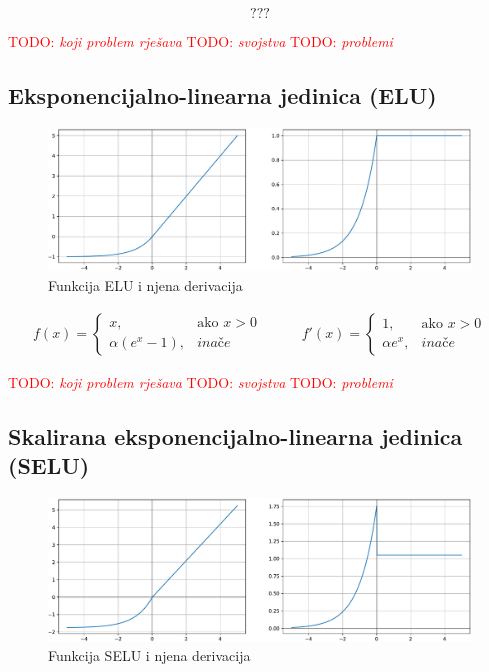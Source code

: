 \documentclass[times, utf8, diplomski]{fer}
\def\otherwise{\textit{inače}}
\def\TODO#1{\noindent\textcolor{red}{TODO: \textit{#1}}\newline}
\def\todo#1{\TODO{#1}}
\def\todoimg#1{\begin{center} \textcolor{red}{\big[ IMAGE: \textit{#1} \big]} \end{center}}
\begin{document}
\todoimg{}

\begin{equation}
???
\end{equation}

\todo{koji problem rješava}
\todo{svojstva}
\todo{problemi}

\subsection{Eksponencijalno-linearna jedinica (ELU)}

\begin{figure}[H]
\includegraphics[width=\textwidth]{ELU.pdf}
\centering
\caption{Funkcija ELU i njena derivacija}
\label{fig:elu}
\end{figure}

\begin{equation}
\label{eq:elu}
\begin{split}
f(x) = 
\begin{cases}
x,					& \text{ako } x > 0 \\
\alpha (e^x - 1),	& \otherwise
\end{cases}
\end{split}
\qquad
\begin{split}
f'(x) = 
\begin{cases}
1,	 		& \text{ako } x > 0 \\
\alpha e^x,	& \otherwise
\end{cases}
\end{split}
\end{equation}

\todo{koji problem rješava}
\todo{svojstva}
\todo{problemi}

\subsection{Skalirana eksponencijalno-linearna jedinica (SELU)}

\begin{figure}[H]
\includegraphics[width=\textwidth]{SELU.pdf}
\centering
\caption{Funkcija SELU i njena derivacija}
\label{fig:selu}
\end{figure}
\end{document}

